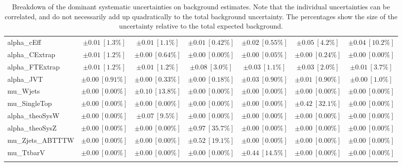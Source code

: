 \begin{sidewaystable}
\begin{center}
\begin{tabular*}{\textwidth}{@{\extracolsep{\fill}}lcccccc}
alpha\_cEff         & $\pm 0.01\ [1.3\%] $          & $\pm 0.01\ [1.1\%] $          & $\pm 0.01\ [0.42\%] $          & $\pm 0.02\ [0.55\%] $          & $\pm 0.05\ [4.2\%] $          & $\pm 0.04\ [10.2\%] $       \\
alpha\_CExtrap         & $\pm 0.01\ [1.2\%] $          & $\pm 0.00\ [0.64\%] $          & $\pm 0.00\ [0.00\%] $          & $\pm 0.00\ [0.05\%] $          & $\pm 0.00\ [0.24\%] $          & $\pm 0.00\ [0.00\%] $       \\
alpha\_FTExtrap         & $\pm 0.01\ [1.2\%] $          & $\pm 0.01\ [1.2\%] $          & $\pm 0.08\ [3.0\%] $          & $\pm 0.03\ [1.1\%] $          & $\pm 0.03\ [2.0\%] $          & $\pm 0.01\ [3.7\%] $       \\
alpha\_JVT         & $\pm 0.00\ [0.91\%] $          & $\pm 0.00\ [0.33\%] $          & $\pm 0.00\ [0.18\%] $          & $\pm 0.03\ [0.90\%] $          & $\pm 0.01\ [0.90\%] $          & $\pm 0.00\ [1.0\%] $       \\
mu\_Wjets         & $\pm 0.00\ [0.00\%] $          & $\pm 0.10\ [13.8\%] $          & $\pm 0.00\ [0.00\%] $          & $\pm 0.00\ [0.00\%] $          & $\pm 0.00\ [0.00\%] $          & $\pm 0.00\ [0.00\%] $       \\
mu\_SingleTop         & $\pm 0.00\ [0.00\%] $          & $\pm 0.00\ [0.00\%] $          & $\pm 0.00\ [0.00\%] $          & $\pm 0.00\ [0.00\%] $          & $\pm 0.42\ [32.1\%] $          & $\pm 0.00\ [0.00\%] $       \\
alpha\_theoSysW         & $\pm 0.00\ [0.00\%] $          & $\pm 0.07\ [9.5\%] $          & $\pm 0.00\ [0.00\%] $          & $\pm 0.00\ [0.00\%] $          & $\pm 0.00\ [0.00\%] $          & $\pm 0.00\ [0.00\%] $       \\
alpha\_theoSysZ         & $\pm 0.00\ [0.00\%] $          & $\pm 0.00\ [0.00\%] $          & $\pm 0.97\ [35.7\%] $          & $\pm 0.00\ [0.00\%] $          & $\pm 0.00\ [0.00\%] $          & $\pm 0.00\ [0.00\%] $       \\
mu\_Zjets\_ABTTTW         & $\pm 0.00\ [0.00\%] $          & $\pm 0.00\ [0.00\%] $          & $\pm 0.52\ [19.1\%] $          & $\pm 0.00\ [0.00\%] $          & $\pm 0.00\ [0.00\%] $          & $\pm 0.00\ [0.00\%] $       \\
mu\_TtbarV         & $\pm 0.00\ [0.00\%] $          & $\pm 0.00\ [0.00\%] $          & $\pm 0.00\ [0.00\%] $          & $\pm 0.44\ [14.5\%] $          & $\pm 0.00\ [0.00\%] $          & $\pm 0.00\ [0.00\%] $       \\
\noalign{\smallskip}\hline\noalign{\smallskip}
\end{tabular*}
\end{center}
\caption[Breakdown of uncertainty on background estimates]{
Breakdown of the dominant systematic uncertainties on background estimates.
Note that the individual uncertainties can be correlated, and do not necessarily add up quadratically to 
the total background uncertainty. The percentages show the size of the uncertainty relative to the total expected background.
\label{table.results.bkgestimate.uncertainties.SRA_TT_bybkg}}
\end{sidewaystable}
%
